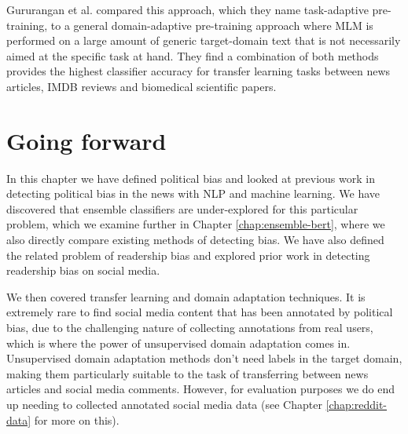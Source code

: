 Gururangan et al. \cite{dont-stop-pretraining} compared this approach, which they name task-adaptive pre-training, to a general domain-adaptive pre-training approach where MLM is performed on a large amount of generic target-domain text that is not necessarily aimed at the specific task at hand. They find a combination of both methods provides the highest classifier accuracy for transfer learning tasks between news articles, IMDB reviews and biomedical scientific papers.

\section{Going forward}

In this chapter we have defined political bias and looked at previous work in detecting political bias in the news with NLP and machine learning. We have discovered that ensemble classifiers are under-explored for this particular problem, which we examine further in Chapter \ref{chap:ensemble-bert}, where we also directly compare existing methods of detecting bias. We have also defined the related problem of readership bias and explored prior work in detecting readership bias on social media.

We then covered transfer learning and domain adaptation techniques. It is extremely rare to find social media content that has been annotated by political bias, due to the challenging nature of collecting annotations from real users, which is where the power of unsupervised domain adaptation comes in. Unsupervised domain adaptation methods don't need labels in the target domain, making them particularly suitable to the task of transferring between news articles and social media comments. However, for evaluation purposes we do end up needing to collected annotated social media data (see Chapter \ref{chap:reddit-data} for more on this).